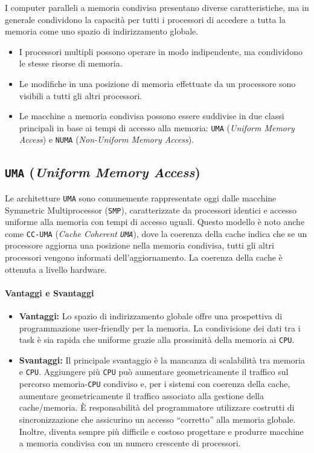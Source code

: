 I computer paralleli a memoria condivisa presentano diverse caratteristiche,
ma in generale condividono la capacità per tutti i processori di accedere a
tutta la memoria come uno spazio di indirizzamento globale.

\begin{itemize}
    \item I processori multipli possono operare in modo indipendente, ma condividono
    le stesse risorse di memoria.
    \item Le modifiche in una posizione di memoria effettuate da un processore sono
    visibili a tutti gli altri processori.
    \item Le macchine a memoria condivisa possono essere suddivise in due classi
    principali in base ai tempi di accesso alla memoria: \texttt{UMA}
    (\textit{Uniform Memory Access})
    e \texttt{NUMA} (\textit{Non-Uniform Memory Access}).
\end{itemize}

\subsection{\texttt{UMA} (\textit{Uniform Memory Access})}
Le architetture \texttt{UMA} sono comunemente rappresentate oggi dalle
macchine Symmetric Multiprocessor (\texttt{SMP}), caratterizzate da processori
identici e accesso uniforme alla memoria con tempi di accesso uguali. Questo
modello è noto anche come \texttt{CC-UMA} (\textit{Cache Coherent \texttt{UMA}}),
dove la coerenza della
cache indica che se un processore aggiorna una posizione nella memoria condivisa,
tutti gli altri processori vengono informati dell'aggiornamento. La coerenza della
cache è ottenuta a livello hardware.

\paragraph{Vantaggi e Svantaggi}
\begin{itemize}
    \item \textbf{Vantaggi:} Lo spazio di indirizzamento globale offre una prospettiva
    di programmazione user-friendly per la memoria. La condivisione dei dati tra i
    task è sia rapida che uniforme grazie alla prossimità della memoria ai \texttt{CPU}.
    \item \textbf{Svantaggi:} Il principale svantaggio è la mancanza di scalabilità
    tra memoria e \texttt{CPU}. Aggiungere più \texttt{CPU} può aumentare
    geometricamente il traffico sul percorso memoria-\texttt{CPU} condiviso e, per i
    sistemi con coerenza della cache, aumentare geometricamente il traffico
    associato alla gestione della cache/memoria. È responsabilità del programmatore
    utilizzare costrutti di sincronizzazione che assicurino un accesso ``corretto''
    alla memoria globale. Inoltre, diventa sempre più difficile e costoso progettare
    e produrre macchine a memoria condivisa con un numero crescente di processori.
\end{itemize}

